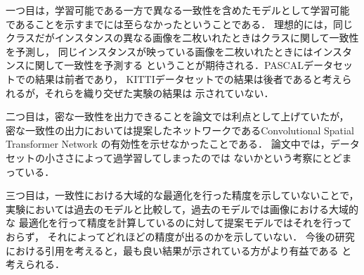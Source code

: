 一つ目は，学習可能である一方で異なる一致性を含めたモデルとして学習可能
であることを示すまでには至らなかったということである．
理想的には，同じクラスだがインスタンスの異なる画像を二枚いれたときはクラスに関して一致性を予測し，
同じインスタンスが映っている画像を二枚いれたときにはインスタンスに関して一致性を予測する
ということが期待される．PASCALデータセットでの結果は前者であり，
KITTIデータセットでの結果は後者であると考えられるが，それらを織り交ぜた実験の結果は
示されていない．

二つ目は，密な一致性を出力できることを論文では利点として上げていたが，
密な一致性の出力においては提案したネットワークであるConvolutional Spatial Transformer Network
の有効性を示せなかったことである．
論文中では，データセットの小ささによって過学習してしまったのでは
ないかという考察にとどまっている．

三つ目は，一致性における大域的な最適化を行った精度を示していないことで，
実験においては過去のモデルと比較して，過去のモデルでは画像における大域的な
最適化を行って精度を計算しているのに対して提案モデルではそれを行っておらず，
それによってどれほどの精度が出るのかを示していない．
今後の研究における引用を考えると，最も良い結果が示されている方がより有益である
と考えられる．

